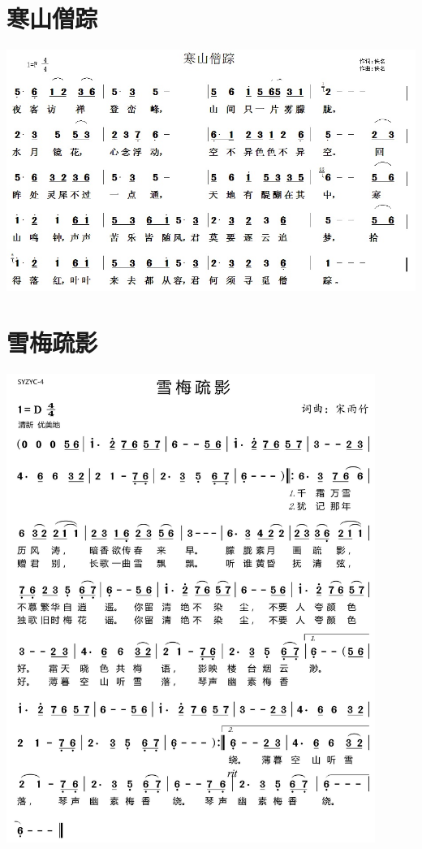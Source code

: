 \documentclass[cn,pad,twocol]{elegantbook}
\begin{document}
\section{寒山僧踪}              \includegraphics[width=\textwidth]{dongxiao/20200710-寒山僧踪.jpg}
\section{雪梅疏影}              \includegraphics[width=0.9\textwidth]{dongxiao/20200725-雪梅疏影}
\end{document}
